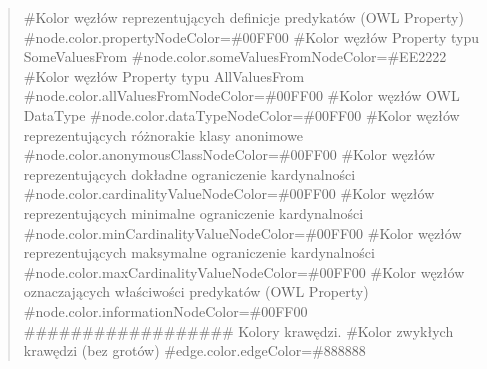 \begin{quote}
\#Kolor węzłów reprezentujących definicje predykatów (OWL Property) \newline
\#node.color.propertyNodeColor=\#00FF00 \newline
 \newline
\#Kolor węzłów Property typu SomeValuesFrom \newline
\#node.color.someValuesFromNodeColor=\#EE2222 \newline
 \newline
\#Kolor węzłów Property typu AllValuesFrom \newline
\#node.color.allValuesFromNodeColor=\#00FF00 \newline
 \newline
\#Kolor węzłów OWL DataType \newline
\#node.color.dataTypeNodeColor=\#00FF00 \newline
 \newline
\#Kolor węzłów reprezentujących różnorakie klasy anonimowe \newline
\#node.color.anonymousClassNodeColor=\#00FF00 \newline
 \newline
\#Kolor węzłów reprezentujących dokładne ograniczenie kardynalności \newline
\#node.color.cardinalityValueNodeColor=\#00FF00 \newline
 \newline
\#Kolor węzłów reprezentujących minimalne ograniczenie kardynalności \newline
\#node.color.minCardinalityValueNodeColor=\#00FF00 \newline
 \newline
\#Kolor węzłów reprezentujących maksymalne ograniczenie kardynalności \newline
\#node.color.maxCardinalityValueNodeColor=\#00FF00 \newline
 \newline
\#Kolor węzłów oznaczających właściwości predykatów (OWL Property) \newline
\#node.color.informationNodeColor=\#00FF00 \newline
 \newline
\#\#\#\#\#\#\#\#\#\#\#\#\#\#\#\#\#\# Kolory krawędzi. \newline
 \newline
\#Kolor zwykłych krawędzi (bez grotów) \newline
\#edge.color.edgeColor=\#888888 \newline
 \newline

\end{quote}
